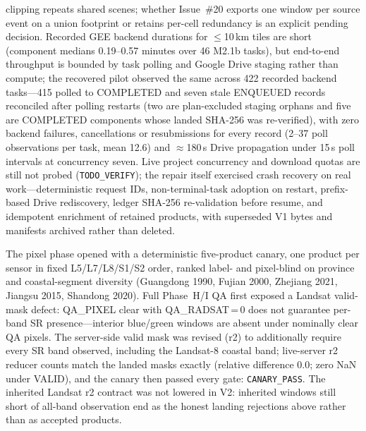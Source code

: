 clipping repeats shared scenes; whether Issue~\#20 exports one window
per source event on a union footprint or retains per-cell redundancy
is an explicit pending decision. Recorded GEE backend durations for
$\le$10\,km tiles are short (component medians 0.19--0.57 minutes over
46 M2.1b tasks), but end-to-end throughput is bounded by task polling
and Google Drive staging rather than compute; the recovered pilot
observed the same across 422 recorded backend tasks---415 polled to
COMPLETED and seven stale ENQUEUED records reconciled after polling
restarts (two are plan-excluded staging orphans and five are
COMPLETED components whose landed SHA-256 was re-verified), with zero
backend failures, cancellations or resubmissions for every record
(2--37 poll observations per task, mean 12.6) and $\approx$180\,s Drive
propagation under 15\,s poll intervals at concurrency seven. Live
project concurrency and download quotas are still not probed
(\texttt{TODO\_VERIFY}); the repair itself exercised crash recovery on
real work---deterministic request IDs, non-terminal-task adoption on
restart, prefix-based Drive rediscovery, ledger SHA-256 re-validation
before resume, and idempotent enrichment of retained products, with
superseded V1 bytes and manifests archived rather than deleted.

The pixel phase opened with a deterministic five-product canary, one
product per sensor in fixed L5/L7/L8/S1/S2 order, ranked label- and
pixel-blind on province and coastal-segment diversity (Guangdong 1990,
Fujian 2000, Zhejiang 2021, Jiangsu 2015, Shandong 2020). Full
Phase~H/I QA first exposed a Landsat valid-mask defect: QA\_PIXEL clear
with QA\_RADSAT\,=\,0 does not guarantee per-band SR presence---interior
blue/green windows are absent under nominally clear QA pixels. The
server-side valid mask was revised (r2) to additionally require every
SR band observed, including the Landsat-8 coastal band; live-server r2
reducer counts match the landed masks exactly (relative difference
0.0; zero NaN under VALID), and the canary then passed every gate:
\texttt{CANARY\_PASS}. The inherited Landsat r2 contract was not
lowered in V2: inherited windows still short of all-band observation
end as the honest landing rejections above rather than as accepted
products.

